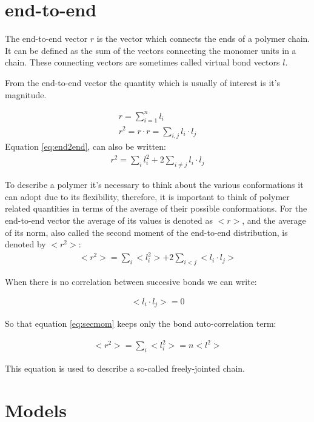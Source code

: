\section{end-to-end}
The end-to-end vector  $r$ is the vector which connects  the ends of a 
polymer chain.  It  can be defined  as the sum  of the vectors connecting the
monomer units in a chain. These connecting vectors are sometimes called
virtual  bond vectors $l$.  

From  the end-to-end  vector  the quantity
which is usually of interest is it's magnitude.

\begin{gather}
\label{eq:end2end}
r = \sum_{i=1}^{n} l_{i}\\
r^2 = r \cdot r = \sum_{i,j}l_{i} \cdot l_{j}
\end{gather}
Equation \ref{eq:end2end}, can also be written:
\begin{gather}
r^2 = \sum_{i}l_{i}^{2} + 2 \sum_{i\neq j} l_{i} \cdot l_{j}
\end{gather}  

To  describe a  polymer  it's  necessary to  think  about the  various
conformations it can adopt  due to its flexibility, therefore, it
is important  to think of polymer  related quantities in  terms of the
average of their possible conformations. For the end-to-end vector the
average of  its values  is denoted  as $<r>$, and  the average  of its
norm, also called the second moment of the end-to-end distribution, is
denoted by $<r^2>$:
\begin{gather}
\label{eq:secmom}  
<r^2>=\sum_{i}<l_{i}^2> + 2\sum_{i<j}<l_{i} \cdot l_{j}>
\end{gather}  

When there is no correlation between succesive bonds we can write:

\begin{gather}
\label{eq:nocorr}
<l_{i} \cdot l_{j}> = 0
\end{gather}

So that equation \ref{eq:secmom} keeps only the bond auto-correlation term:

\begin{gather}
<r^2> = \sum_{i}<l_{i}^2> = n<l^2>
\end{gather}  

This equation is used to describe a so-called freely-jointed chain.





\section{Models}

